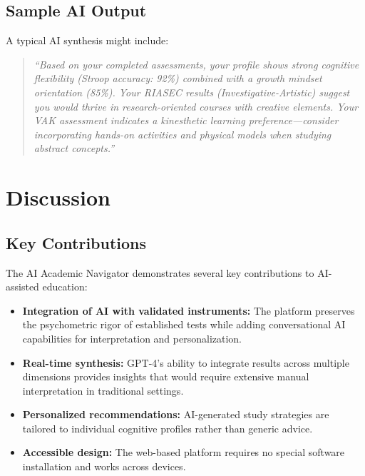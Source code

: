 \documentclass[11pt,a4paper]{article}
\begin{document}
\subsection{Sample AI Output}

A typical AI synthesis might include:

\begin{quote}
\textit{``Based on your completed assessments, your profile shows strong cognitive flexibility (Stroop accuracy: 92\%) combined with a growth mindset orientation (85\%). Your RIASEC results (Investigative-Artistic) suggest you would thrive in research-oriented courses with creative elements. Your VAK assessment indicates a kinesthetic learning preference---consider incorporating hands-on activities and physical models when studying abstract concepts.''}
\end{quote}

\section{Discussion}

\subsection{Key Contributions}

The AI Academic Navigator demonstrates several key contributions to AI-assisted education:

\begin{itemize}[noitemsep]
    \item \textbf{Integration of AI with validated instruments:} The platform preserves the psychometric rigor of established tests while adding conversational AI capabilities for interpretation and personalization.

    \item \textbf{Real-time synthesis:} GPT-4's ability to integrate results across multiple dimensions provides insights that would require extensive manual interpretation in traditional settings.

    \item \textbf{Personalized recommendations:} AI-generated study strategies are tailored to individual cognitive profiles rather than generic advice.

    \item \textbf{Accessible design:} The web-based platform requires no special software installation and works across devices.
\end{itemize}
\end{document}

